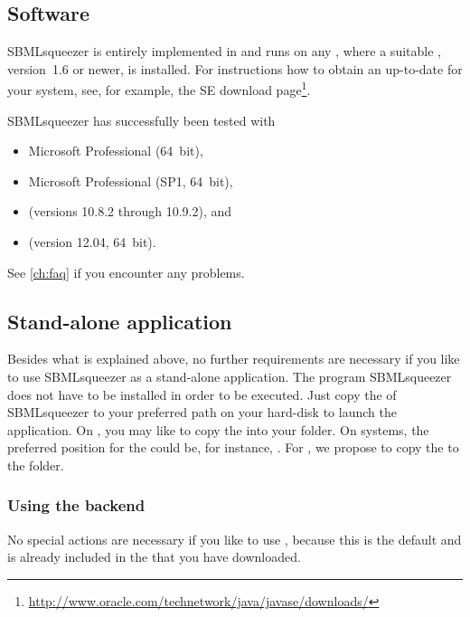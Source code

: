 \subsection{Software}\label{sec:SoftwareRequirements}

SBMLsqueezer is entirely implemented in \Java and runs on any \OS, where a 
suitable \JVM, \JDK version~1.6 or newer, is installed.
For instructions how to obtain an up-to-date \JVM for your system, see, for 
example, the \Java SE download
page\footnote{\url{http://www.oracle.com/technetwork/java/javase/downloads/}\label{fn:jvmldl}}.

SBMLsqueezer has successfully been tested with
\begin{itemize}
  \item Microsoft \WindowsSeven Professional (64~bit),
  \item Microsoft \WindowsSeven Professional (SP1, 64~bit),
  \item \MacOSX (versions 10.8.2 through 10.9.2), and
  \item \UbuntuLinux (version 12.04, 64~bit).
\end{itemize}
See \vref{ch:faq} if you encounter any problems.

\subsection{Stand-alone application}
\label{sec:StandAlone}

Besides what is explained above, no further requirements are necessary if you
like to use SBMLsqueezer as a stand-alone application.
The program SBMLsqueezer does not have to be installed in order to be executed.
Just copy the \JAR of SBMLsqueezer to your preferred path on your hard-disk
to launch the application.
On \MacOSX, you may like to copy the \JAR into your
folder.
On \Windows systems, the preferred position for the \JAR could be, for
instance,
.
For \Linux, we propose to copy the \JAR to the  folder.


\subsubsection{Using the \JSBML backend}

No special actions are necessary if you like to use \JSBML, because this is the
default and \JSBML is already included in the \JAR that you have downloaded.

